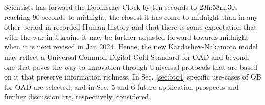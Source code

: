 \documentclass[final,5p,times,twocolumn,authoryear]{elsarticle}
\begin{document}
Scientists has forward the Doomsday Clock by ten seconds to 23h:58m:30s reaching 90 seconds to midnight, the closest it has come to midnight than in any other period in recorded Human history and that there is some expectation that with the war in Ukraine it may be further adjusted forward towards midnight when it is next revised in Jan 2024. Hence, the new Kardashev-Nakamoto model may reflect a Universal Common Digital Gold Standard for OAD and beyond, one that paves the way to innovation through Universal protocols that are based on it that preserve information richness.  In Sec. \ref{sec:btc4} specific use-cases of OB for OAD are selected, and in Sec. 5 and 6 future application prospects and further discussion are, respectively, considered.



\end{document}
